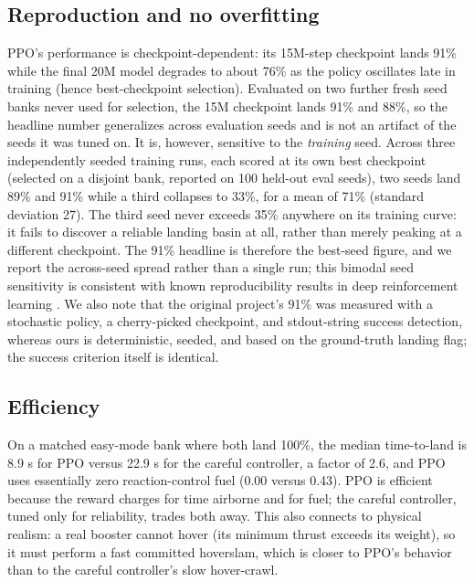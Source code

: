 \documentclass[10pt,twocolumn]{article}
\begin{document}
\subsection{Reproduction and no overfitting}
\label{sec:repro}
PPO's performance is checkpoint-dependent: its 15M-step checkpoint lands 91\% while the final 20M model degrades to about 76\% as the policy oscillates late in training (hence best-checkpoint selection). Evaluated on two further fresh seed banks never used for selection, the 15M checkpoint lands 91\% and 88\%, so the headline number generalizes across evaluation seeds and is not an artifact of the seeds it was tuned on. It is, however, sensitive to the \emph{training} seed. Across three independently seeded training runs, each scored at its own best checkpoint (selected on a disjoint bank, reported on 100 held-out eval seeds), two seeds land 89\% and 91\% while a third collapses to 33\%, for a mean of 71\% (standard deviation 27). The third seed never exceeds 35\% anywhere on its training curve: it fails to discover a reliable landing basin at all, rather than merely peaking at a different checkpoint. The 91\% headline is therefore the best-seed figure, and we report the across-seed spread rather than a single run; this bimodal seed sensitivity is consistent with known reproducibility results in deep reinforcement learning \cite{henderson2018matters}. We also note that the original project's 91\% was measured with a stochastic policy, a cherry-picked checkpoint, and stdout-string success detection, whereas ours is deterministic, seeded, and based on the ground-truth landing flag; the success criterion itself is identical.

\subsection{Efficiency}
On a matched easy-mode bank where both land 100\%, the median time-to-land is 8.9 s for PPO versus 22.9 s for the careful controller, a factor of 2.6, and PPO uses essentially zero reaction-control fuel (0.00 versus 0.43). PPO is efficient because the reward charges for time airborne and for fuel; the careful controller, tuned only for reliability, trades both away. This also connects to physical realism: a real booster cannot hover (its minimum thrust exceeds its weight), so it must perform a fast committed hoverslam, which is closer to PPO's behavior than to the careful controller's slow hover-crawl.
\end{document}
